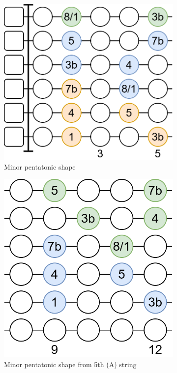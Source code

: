 \begin{figure}[h]
	\vspace{0.5cm}
	
	\begin{subfigure}[b]{0.45\textwidth}
		\centering
		\includegraphics[height=0.175\textheight]{../../Images/guitar_minor_pentatonic_standard.png}
		\caption{Minor pentatonic shape}
		\label{fig:guitar_minor_pentatonic_shape}
	\end{subfigure}
	\hfill
	\begin{subfigure}[b]{0.45\textwidth}
		\centering
		\includegraphics[height=0.175\textheight]{../../Images/guitar_minor_pentatonic_standard_start_5th_string.png}
		\caption{Minor pentatonic shape from 5th (A) string}
		\label{fig:guitar_minor_pentatonic_shape_start_5th_string}
	\end{subfigure}
	\caption{}
	\label{fig:guitar_major_minor_pentatonic_shapes}
\end{figure}

